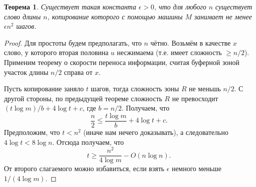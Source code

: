 \documentclass[12pt]{article}
\theoremstyle{definition}
\theoremstyle{plain}
\newtheorem{theorem}{Теорема}[section]
\theoremstyle{remark}
\begin{document}
\begin{theorem}
    Существует такая константа $\epsilon>0$, что для любого $n$ существует слово длины $n$,
    копирование которого с помощью машины $M$ занимает не менее $\epsilon n^2$ шагов.
\end{theorem}
\begin{proof}
    Для простоты будем предполагать, что $n$ чётно. Возьмём в качестве $x$ слово,
    у которого вторая половина $u$ несжимаема (т.е. имеет сложность $\ge n/2$).
    Применим теорему о скорости переноса информации, считая буферной зоной
    участок длины $n/2$ справа от $x$.
\begin{center}
\end{center}

Пусть копирование заняло $t$ шагов, тогда сложность зоны $R$ не меньшь $n/2$.
С другой стороны, по предыдущей теореме сложность $R$ не превосходит $(t\log m)/b + 4\log t + c$,
где $b = n/2$. Получаем, что
\[
    \frac{n}{2} \le \frac{t\log m}{b} + 4\log t + c.
\]
Предположим, что $t < n^2$ (иначе нам нечего доказывать), а следовательно $4\log t <  8\log n$.
Отсюда получаем, что
\[
    t\ge\frac{n^2}{4\log m} - O(n\log n).
\]
От второго слагаемого можно избавиться, если взять $\epsilon$ немного меньше $1/(4\log m)$. 
\end{proof}
\end{document}
